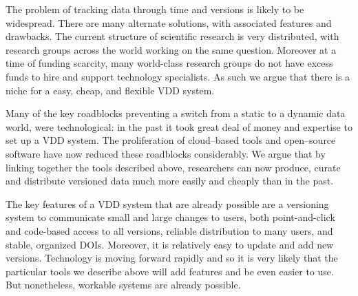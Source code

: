 \documentclass[a4paper,11pt]{article}
\begin{document}
The problem of tracking data through time and versions is likely to be widespread. There are many alternate solutions, with associated features and drawbacks.  The current structure of scientific research is very distributed, with research groups across the world working on the same question.  Moreover at a time of funding scarcity, many world-class research groups do not have excess funds to hire and support technology specialists.  As such we argue that there is a niche for a easy, cheap, and flexible VDD system.  

Many of the key roadblocks preventing a switch from a static to a dynamic data world, were technological: in the past it took great deal of money and expertise to set up a VDD system. The proliferation of cloud--based tools and open--source software have now reduced these roadblocks considerably.  We argue that by linking together the tools described above, researchers can now produce, curate and distribute versioned data much more easily and cheaply than in the past.  

The key features of a VDD system that are already possible are a versioning system to communicate small and large changes to users, both point-and-click and code-based access to all versions, reliable distribution to many users, and stable, organized DOIs.  Moreover, it is relatively easy to update and add new versions.  Technology is moving forward rapidly and so it is very likely that the particular tools we describe above will add features and be even easier to use.  But nonetheless, workable systems are already possible.  



%
%
\end{document}
